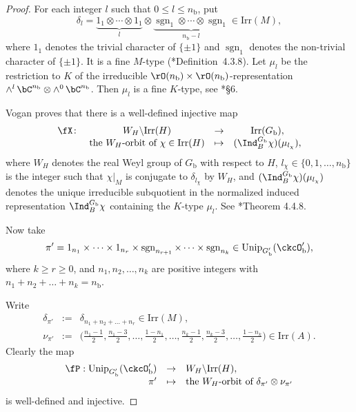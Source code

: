\documentclass[12pt,a4paper]{amsart}
\newcommand{\cusp}{{\mathrm{cusp}}}
\newcommand{\sgn}{\operatorname{sgn}}
\numberwithin{equation}{section}
\theoremstyle{remark}
\def\Irr{\mathrm{Irr}}
\def\Unip{\mathrm{Unip}}
\def\ckcOpb{\ckcO'_{\mathrm b}}
\def\nnb{n_{\mathrm b}}
\def\Gb{G_{\mathrm b}}
\def\Gpb{G'_{\mathrm b}}
\begin{document}
\begin{proof}
 For each integer $l$ such that $0\leq l \leq \nnb$, put
    \[
      \delta_{l} = \underbrace{1_{1}\otimes \cdots \otimes 1_{1}}_{l} \otimes
      \underbrace{\sgn_{1} \otimes \cdots \otimes \sgn_{1}}_{\nnb-l}\in \Irr(M),
    \]
    where $1_{1}$ denotes the trivial character of $\{\pm 1\}$ and $\sgn_{1}$ denotes the non-trivial character of $\{\pm 1\}$. 
It is a fine $M$-type (\cite{Vg}*{Definition~4.3.8}). Let $\mu_{l}$ be
    the restriction to $K$ of the irreducible
    $\rO(\nnb)\times \rO(\nnb)$-representation
    $\wedge^{l}\,\bC^{\nnb}\otimes \wedge^{0}\,\bC^{\nnb}$. Then $\mu_{l}$ is a
    fine $K$-type, see \cite{BGG.M}*{\S 6}.

    \def\cusp{\fC}
    
    Vogan proves that there is a well-defined injective map 
\[
      \begin{array}{lccc}
       \fX\colon &   W_H\backslash \Irr(H)&\rightarrow & \Irr(G_\mathrm b),\\
       & \textrm{the $W_H$-orbit of $\chi\in \Irr(H)$} & \mapsto & (\Ind_{B}^{\Gb}\chi)(\mu_{l_\chi}), 
      \end{array}
    \]
    where $W_H$ denotes the real Weyl group of $G_\mathrm b$ with respect to $H$,  $l_\chi\in\{0,1, \dots, n_\mathrm b\}$ is the integer such that $\chi|_M$ is conjugate to $\delta_{l_\chi}$ by $W_H$, and $(\Ind_{B}^{\Gb}\chi)(\mu_{l_\chi})$ denotes the unique
    irreducible subquotient in the normalized induced representation 
    $\Ind_{B}^{\Gb}\chi$ containing the $K$-type $\mu_{l}$. See \cite{Vg}*{Theorem 4.4.8}.
    
        Now take
         \[
         \pi' = 1_{n_{1}}\times \cdots \times 1_{n_{r}}\times \sgn_{n_{r+1}}\times \cdots \times \sgn_{n_{k}}\in \Unip_{\Gpb}(\ckcOpb), 
         \]
       where   $k\geq r\geq 0$,  and $n_1, n_2, \dots, n_k$ are positive integers with  $n_1+n_2+ \dots+ n_k=\nnb$. 
       
       
           
    Write
    \begin{eqnarray*}
    \delta_{\pi'}&:=&\delta_{n_{1}+n_{2}+\dots + n_{r}}\in \Irr(M),\\
        \nu_{\pi'} &:=& \big( {\tfrac{n_{1}-1}{2},\tfrac{n_{1}-3}{2},\dots ,\tfrac{1-n_{1}}{2}, \dots , \tfrac{n_{k}-1}{2},\tfrac{n_{k}-3}{2},\dots ,\tfrac{1-n_{k}}{2}} \big)\in \Irr(A).
   \end{eqnarray*}
   Clearly the map 
   \[
   \begin{array}{rcl}
     \fP:   \Unip_{\Gpb}(\ckcOpb)&\rightarrow &  W_H\backslash \Irr(H),\\
      \pi' &\mapsto & \textrm{the $W_H$-orbit of $\delta_{\pi'}\otimes \nu_{\pi'}$}
      \end{array}
      \]
       is well-defined and 
    injective. 


\end{proof}
\end{document}

